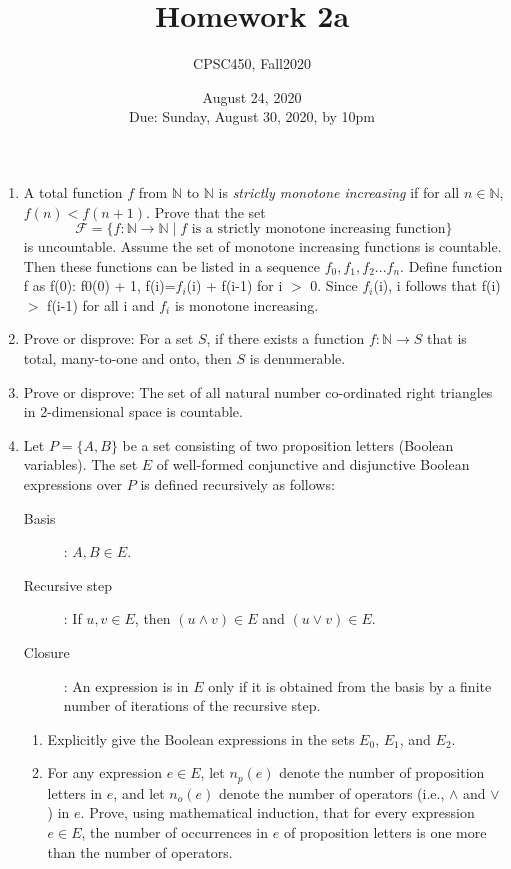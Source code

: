 \documentclass{article}
\title{Homework 2a}
\author{CPSC450, Fall2020}
\date{August 24, 2020\\
Due: Sunday, August 30, 2020, by 10pm}
\newcommand{\nat}{\mathbb{N}}
\begin{document}
\maketitle

\begin{enumerate}

\item A total function $f$ from $\nat$ to $\nat$ is \emph{strictly
  monotone increasing} if for all $n \in \nat$, $f(n) <
  f(n+1)$. Prove that the set
  \[
   \mathcal{F} = \{f: \nat \to \nat \mid f \mbox{ is a strictly monotone increasing
     function}\}
   \]
is uncountable. 
\newline Assume the set of monotone increasing functions is countable. Then these functions can be listed in a sequence $f_0, f_1, f_2...f_n.$ Define function f as f(0): f0(0) + 1, f(i)=$f_i$(i) + f(i-1) for i $>$ 0. Since $f_i$(i), i follows that f(i) $>$ f(i-1) for all i and $f_i$ is monotone increasing. 

\item Prove or disprove: For a set $S$, if there exists a
  function $f: \nat \to
  S$ that is total, many-to-one and onto, then $S$ is denumerable.

\item Prove or disprove: The set of all natural number co-ordinated right
  triangles in 2-dimensional space is countable.

\item\label{boolean} Let $P = \{A, B\}$ be a set consisting of two
  proposition 
  letters (Boolean variables). The set $E$ of well-formed conjunctive
  and disjunctive Boolean expressions over $P$ is defined recursively
  as follows:
\begin{description}
\item[Basis]: $A, B \in E$.
\item[Recursive step]: If $u, v \in E$, then $(u
  \wedge v) \in E$ and
  $(u \vee v) \in E$.
\item[Closure]: An expression is in $E$ only if it is obtained from
  the basis by a finite number of iterations of the recursive step.
\end{description}

\begin{enumerate}
\item Explicitly give the Boolean expressions in the sets $E_0$,
  $E_1$, and $E_2$.

\item For any expression $e \in E$, let $n_p(e)$ denote the number of
  proposition letters in $e$, and let $n_o(e)$ denote the number of
  operators (i.e., $\wedge$ and $\vee$) in $e$. Prove, using
  mathematical induction, that for
  every expression $e \in E$, the number of
  occurrences in $e$ of proposition letters is one more than the
  number of operators.
\end{enumerate}


\end{enumerate}
\end{document}
